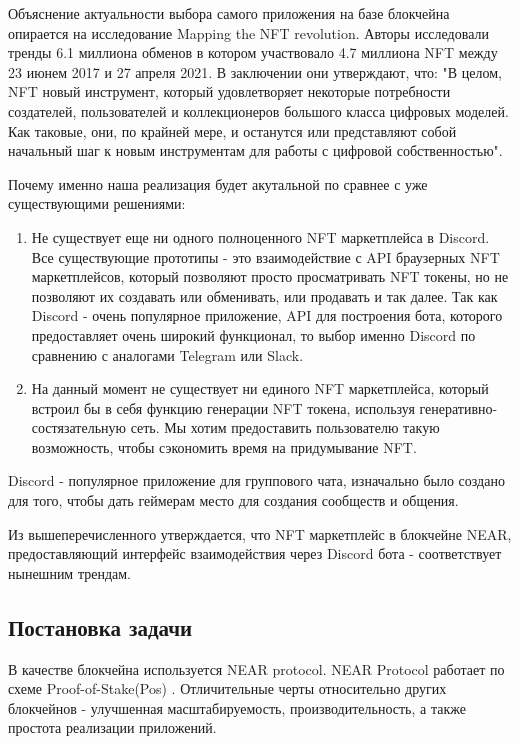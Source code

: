Объяснение актуальности выбора самого приложения на базе блокчейна опирается на исследование Mapping the NFT revolution\cite{nftrevolution}. Авторы исследовали тренды 6.1 миллиона обменов в котором участвовало 4.7 миллиона NFT между 23 июнем 2017 и 27 апреля 2021. В заключении они утверждают, что: "В целом, NFT новый инструмент, который удовлетворяет некоторые потребности создателей, пользователей и коллекционеров большого класса цифровых моделей. Как таковые, они, по крайней мере, и останутся или представляют собой начальный шаг к новым инструментам для работы с цифровой собственностью".

Почему именно наша реализация будет акутальной по сравнее с уже существующими решениями:


\begin{enumerate}
	\item Не существует еще ни одного полноценного NFT маркетплейса в Discord. Все существующие прототипы - это взаимодействие с API браузерных NFT маркетплейсов, который позволяют просто просматривать NFT токены, но не позволяют их создавать или обменивать, или продавать и так далее.
    Так как Discord - очень популярное приложение, API для построения бота, которого предоставляет очень широкий функционал, то выбор именно Discord по сравнению с аналогами Telegram или Slack.
	\item На данный момент не существует ни единого NFT маркетплейса, который встроил бы в себя функцию генерации NFT токена, используя генеративно-состязательную сеть. Мы хотим предоставить пользователю такую возможность, чтобы сэкономить время на придумывание NFT.
\end{enumerate}

\begin{definition}
    Discord - популярное приложение для группового чата, изначально было создано для того, чтобы дать геймерам место для создания сообществ и общения.
\end{definition}

Из вышеперечисленного утверждается, что NFT маркетплейс в блокчейне NEAR, предоставляющий интерфейс взаимодействия через Discord бота - соответствует нынешним трендам.


\subsection{Постановка задачи}
В качестве блокчейна используется NEAR protocol\cite{nearprotocol_2022}. NEAR Protocol работает по схеме Proof-of-Stake(Pos) \cite{nearprotocolpos}. Отличительные черты относительно других блокчейнов - улучшенная масштабируемость, производительность, а также простота реализации приложений.

